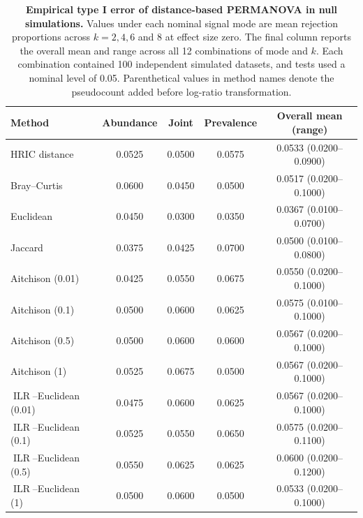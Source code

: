 \begin{table}[t]
    \centering
    \caption{\textbf{Empirical type I error of distance-based PERMANOVA in
    null simulations.}
    Values under each nominal signal mode are mean rejection proportions
    across \(k=2,4,6\) and 8 at effect size zero. The final column reports the
    overall mean and range across all 12 combinations of mode and \(k\).
    Each combination contained 100 independent simulated datasets, and tests
    used a nominal level of 0.05. Parenthetical values in method names denote
    the pseudocount added before log-ratio transformation.}
    \label{tab:simulation-type1}
    \begin{tabular}{lcccc}
        \toprule
        Method & Abundance & Joint & Prevalence & Overall mean (range) \\
        \midrule
        HRIC distance & 0.0525 & 0.0500 & 0.0575 &
        0.0533 (0.0200--0.0900) \\
        Bray--Curtis & 0.0600 & 0.0450 & 0.0500 &
        0.0517 (0.0200--0.1000) \\
        Euclidean & 0.0450 & 0.0300 & 0.0350 &
        0.0367 (0.0100--0.0700) \\
        Jaccard & 0.0375 & 0.0425 & 0.0700 &
        0.0500 (0.0100--0.0800) \\
        Aitchison (0.01) & 0.0425 & 0.0550 & 0.0675 &
        0.0550 (0.0200--0.1000) \\
        Aitchison (0.1) & 0.0500 & 0.0600 & 0.0625 &
        0.0575 (0.0100--0.1000) \\
        Aitchison (0.5) & 0.0500 & 0.0600 & 0.0600 &
        0.0567 (0.0200--0.1000) \\
        Aitchison (1) & 0.0525 & 0.0675 & 0.0500 &
        0.0567 (0.0200--0.1000) \\
        \(\operatorname{ILR}\)--Euclidean (0.01) &
        0.0475 & 0.0600 & 0.0625 & 0.0567 (0.0200--0.1000) \\
        \(\operatorname{ILR}\)--Euclidean (0.1) &
        0.0525 & 0.0550 & 0.0650 & 0.0575 (0.0200--0.1100) \\
        \(\operatorname{ILR}\)--Euclidean (0.5) &
        0.0550 & 0.0625 & 0.0625 & 0.0600 (0.0200--0.1200) \\
        \(\operatorname{ILR}\)--Euclidean (1) &
        0.0500 & 0.0600 & 0.0500 & 0.0533 (0.0200--0.1000) \\
        \bottomrule
    \end{tabular}
\end{table}

